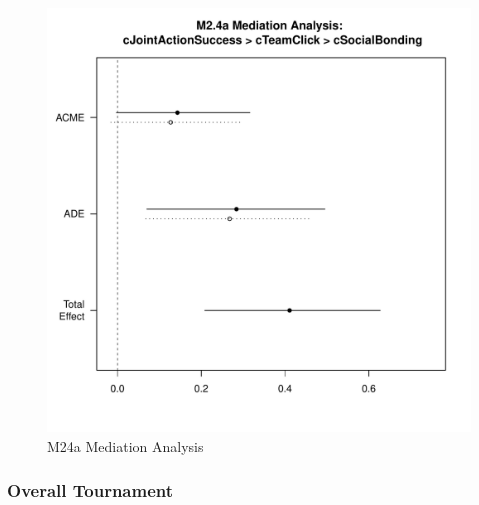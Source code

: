       \begin{figure}[htbp]
        \centering
        \includegraphics[scale=.5]{images/MLM24aMediationAnalysis.pdf}
        \caption{M24a Mediation Analysis}
        \label{fig:MLM24aMediationAnalysis}
      \end{figure}

      \subsubsection{Overall Tournament}


